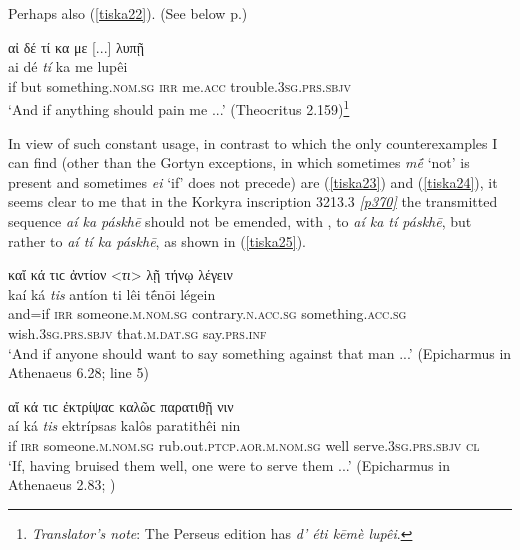 Perhaps also (\ref{tiska22}). (See below p\pageref{Theocritus2159}.)

\begin{exe}
\ex αἰ δέ τί κα με {[}...{]} λυπῇ\\
\gll ai dé \emph{tí} ka me lupêi\\
if but something.\textsc{nom.sg} \textsc{irr} me.\textsc{acc}
trouble.\textsc{3sg.prs.sbjv}\\
\trans `And if anything should pain me ...' (Theocritus 2.159)\footnote{\emph{Translator's note}: The Perseus edition has \textit{d' éti kēmè lupêi}.}
\label{tiska22}
\end{exe}

In view of such constant usage, in contrast to which the only counterexamples I can find (other than the Gortyn exceptions, in which sometimes \textit{mḗ} `not' is present and sometimes \textit{ei} `if' does not precede) are (\ref{tiska23}) and (\ref{tiska24}), it seems clear to me that in the Korkyra inscription 3213.3 \hyperlink{p370}{\emph{[p370]}} the transmitted sequence \textit{aí ka páskhē} should not be emended, with \citet[27]{Boeckh1843}, to \textit{aí ka \emph{tí} páskhē}, but rather to \textit{aí \emph{tí} ka páskhē}, as shown in (\ref{tiska25}).

\begin{exe}
\ex καἴ κά τιϲ ἀντίον \textless{}\emph{τι}\textgreater{} λῇ τήνῳ λέγειν\\
\gll kaí ká \emph{tis} antíon ti lêi tḗnōi légein\\
and=if \textsc{irr} someone.\textsc{m.nom.sg} contrary.\textsc{n.acc.sg} something.\textsc{acc.sg} wish.\textsc{3sg.prs.sbjv} that.\textsc{m.dat.sg} say.\textsc{prs.inf}\\
\trans `And if anyone should want to say something against that man ...' (Epicharmus in Athenaeus 6.28; \citealp[227]{Lorenz1864} line 5)
\label{tiska23}
\end{exe}

\begin{exe}
\ex αἴ κά τιϲ ἐκτρίψαϲ καλῶϲ παρατιθῇ νιν\\
\gll aí ká \emph{tis} ektrípsas kalôs paratithêi nin\\
if \textsc{irr} someone.\textsc{m.nom.sg} rub.out.\textsc{ptcp.aor.m.nom.sg} well serve.\textsc{3sg.prs.sbjv} \textsc{cl}\\
\trans `If, having bruised them well, one were to serve them ...' (Epicharmus in Athenaeus 2.83; \citealp[281]{Lorenz1864})
\label{tiska24}
\end{exe}


